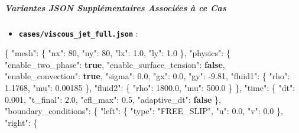 \documentclass[
  10pt,
]{article}
\newenvironment{Shaded}{}{}
\newcommand{\DataTypeTok}[1]{\textcolor[rgb]{0.56,0.13,0.00}{#1}}
\newcommand{\DecValTok}[1]{\textcolor[rgb]{0.25,0.63,0.44}{#1}}
\newcommand{\FloatTok}[1]{\textcolor[rgb]{0.25,0.63,0.44}{#1}}
\newcommand{\FunctionTok}[1]{\textcolor[rgb]{0.02,0.16,0.49}{#1}}
\newcommand{\KeywordTok}[1]{\textcolor[rgb]{0.00,0.44,0.13}{\textbf{#1}}}
\newcommand{\StringTok}[1]{\textcolor[rgb]{0.25,0.44,0.63}{#1}}
\providecommand{\tightlist}{%
  \setlength{\itemsep}{0pt}\setlength{\parskip}{0pt}}
\begin{document}
\subparagraph{Variantes JSON Supplémentaires Associées à ce
Cas}\label{variantes-json-suppluxe9mentaires-associuxe9es-uxe0-ce-cas-4}

\begin{itemize}
\tightlist
\item
  \textbf{\texttt{cases/viscous\_jet\_full.json}} :
\end{itemize}

\begin{Shaded}
\begin{Highlighting}[]
\FunctionTok{\{}
  \DataTypeTok{"mesh"}\FunctionTok{:} \FunctionTok{\{}
    \DataTypeTok{"nx"}\FunctionTok{:} \DecValTok{80}\FunctionTok{,}
    \DataTypeTok{"ny"}\FunctionTok{:} \DecValTok{80}\FunctionTok{,}
    \DataTypeTok{"lx"}\FunctionTok{:} \FloatTok{1.0}\FunctionTok{,}
    \DataTypeTok{"ly"}\FunctionTok{:} \FloatTok{1.0}
  \FunctionTok{\},}
  \DataTypeTok{"physics"}\FunctionTok{:} \FunctionTok{\{}
    \DataTypeTok{"enable\_two\_phase"}\FunctionTok{:} \KeywordTok{true}\FunctionTok{,}
    \DataTypeTok{"enable\_surface\_tension"}\FunctionTok{:} \KeywordTok{false}\FunctionTok{,}
    \DataTypeTok{"enable\_convection"}\FunctionTok{:} \KeywordTok{true}\FunctionTok{,}
    \DataTypeTok{"sigma"}\FunctionTok{:} \FloatTok{0.0}\FunctionTok{,}
    \DataTypeTok{"gx"}\FunctionTok{:} \FloatTok{0.0}\FunctionTok{,}
    \DataTypeTok{"gy"}\FunctionTok{:} \FloatTok{{-}9.81}\FunctionTok{,}
    \DataTypeTok{"fluid1"}\FunctionTok{:} \FunctionTok{\{}
      \DataTypeTok{"rho"}\FunctionTok{:} \FloatTok{1.1768}\FunctionTok{,}
      \DataTypeTok{"mu"}\FunctionTok{:} \FloatTok{0.00185}
    \FunctionTok{\},}
    \DataTypeTok{"fluid2"}\FunctionTok{:} \FunctionTok{\{}
      \DataTypeTok{"rho"}\FunctionTok{:} \FloatTok{1800.0}\FunctionTok{,}
      \DataTypeTok{"mu"}\FunctionTok{:} \FloatTok{500.0}
    \FunctionTok{\}}
  \FunctionTok{\},}
  \DataTypeTok{"time"}\FunctionTok{:} \FunctionTok{\{}
    \DataTypeTok{"dt"}\FunctionTok{:} \FloatTok{0.001}\FunctionTok{,}
    \DataTypeTok{"t\_final"}\FunctionTok{:} \FloatTok{2.0}\FunctionTok{,}
    \DataTypeTok{"cfl\_max"}\FunctionTok{:} \FloatTok{0.5}\FunctionTok{,}
    \DataTypeTok{"adaptive\_dt"}\FunctionTok{:} \KeywordTok{false}
  \FunctionTok{\},}
  \DataTypeTok{"boundary\_conditions"}\FunctionTok{:} \FunctionTok{\{}
    \DataTypeTok{"left"}\FunctionTok{:} \FunctionTok{\{}
      \DataTypeTok{"type"}\FunctionTok{:} \StringTok{"FREE\_SLIP"}\FunctionTok{,}
      \DataTypeTok{"u"}\FunctionTok{:} \FloatTok{0.0}\FunctionTok{,}
      \DataTypeTok{"v"}\FunctionTok{:} \FloatTok{0.0}
    \FunctionTok{\},}
    \DataTypeTok{"right"}\FunctionTok{:} \FunctionTok{\{}

\end{Highlighting}
\end{Shaded}
\end{document}
